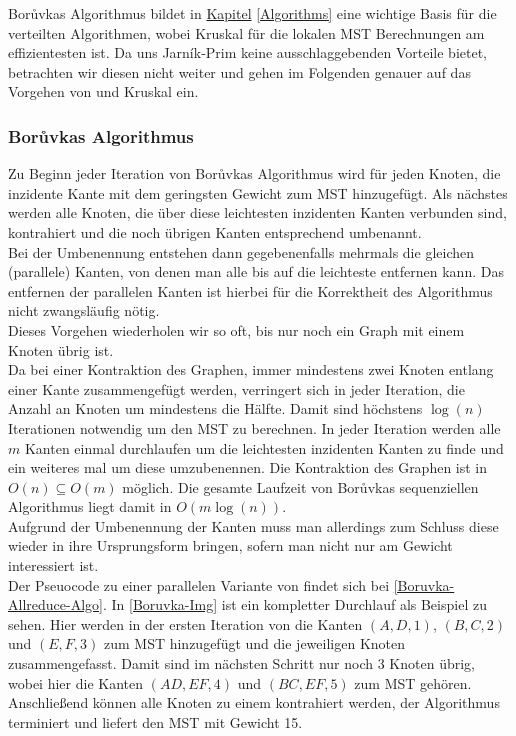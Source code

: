 Bor{\r u}vkas Algorithmus bildet in \hyperref[Algorithms]{Kapitel} \ref{Algorithms} eine wichtige Basis für die verteilten Algorithmen, wobei Kruskal für die lokalen MST Berechnungen am effizientesten ist. Da uns Jarník-Prim keine ausschlaggebenden Vorteile bietet, betrachten wir diesen nicht weiter und gehen im Folgenden genauer auf das Vorgehen von \boruvka und Kruskal ein.

\subsubsection{Bor{\r u}vkas Algorithmus}
Zu Beginn jeder Iteration von Bor{\r u}vkas Algorithmus wird für jeden Knoten, die inzidente Kante mit dem geringsten Gewicht zum MST hinzugefügt.
Als nächstes werden alle Knoten, die über diese leichtesten inzidenten Kanten verbunden sind, kontrahiert und die noch übrigen Kanten entsprechend umbenannt. \\
Bei der Umbenennung entstehen dann gegebenenfalls mehrmals die gleichen (parallele) Kanten, von denen man alle bis auf die leichteste entfernen kann. Das entfernen der parallelen Kanten ist hierbei für die Korrektheit des Algorithmus nicht zwangsläufig nötig. \\
Dieses Vorgehen wiederholen wir so oft, bis nur noch ein Graph mit einem Knoten übrig ist. \\
Da bei einer Kontraktion des Graphen, immer mindestens zwei Knoten entlang einer Kante zusammengefügt werden, verringert sich in jeder Iteration, die Anzahl an Knoten um mindestens die Hälfte. Damit 
sind höchstens $\log(n)$ Iterationen notwendig um den MST zu berechnen. In jeder Iteration werden alle $m$ Kanten einmal durchlaufen um die leichtesten inzidenten Kanten zu finde und ein weiteres mal um diese umzubenennen. Die Kontraktion des Graphen ist in $O(n) \subseteq O(m)$ möglich. Die gesamte Laufzeit von Bor{\r u}vkas sequenziellen Algorithmus liegt damit in $O(m\log(n))$.\\
Aufgrund der Umbenennung der Kanten muss man allerdings zum Schluss diese wieder in ihre Ursprungsform bringen, sofern man nicht nur am Gewicht interessiert ist.\\

Der Pseuocode zu einer parallelen Variante von \boruvka findet sich bei \cref{Boruvka-Allreduce-Algo}. In \cref{Boruvka-Img} ist ein kompletter Durchlauf als Beispiel zu sehen. Hier werden in der ersten Iteration von \boruvka die Kanten $(A,D,1)$, $(B,C,2)$ und $(E,F,3)$ zum MST hinzugefügt und die jeweiligen Knoten zusammengefasst. Damit sind im nächsten Schritt nur noch 3 Knoten übrig, wobei hier die Kanten $(AD,EF,4)$ und $(BC,EF,5)$ zum MST gehören. Anschließend können alle Knoten zu einem kontrahiert werden, der Algorithmus terminiert und liefert den MST mit Gewicht 15.

